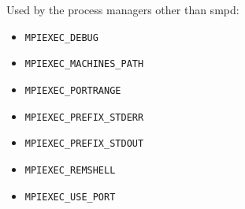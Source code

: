 \documentclass[dvipdfm,11pt]{article}
\begin{document}
Used by the process managers other than smpd:
\begin{itemize}
\item \texttt{MPIEXEC\_DEBUG}
\item \texttt{MPIEXEC\_MACHINES\_PATH}
\item \texttt{MPIEXEC\_PORTRANGE}
\item \texttt{MPIEXEC\_PREFIX\_STDERR}
\item \texttt{MPIEXEC\_PREFIX\_STDOUT}
\item \texttt{MPIEXEC\_REMSHELL}
\item \texttt{MPIEXEC\_USE\_PORT}
\end{itemize}
\end{document}
